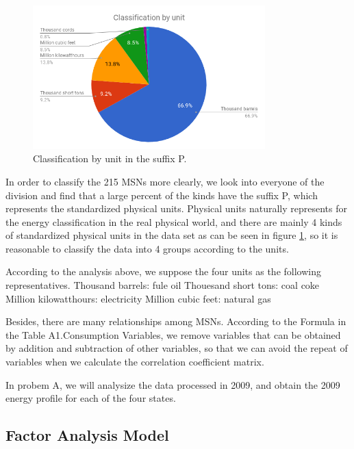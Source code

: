 \documentclass[a4paper,11pt]{article}
\begin{document}
\begin{figure}[!h]%
    \centering 
    \includegraphics[width=0.8\textwidth]{./Pic/classification_by_unit.png}
    \caption{Classification by unit in the suffix P.}
    \label{fig:classification_by_unit}  
\end{figure}

\par In order to classify the 215 MSNs more clearly, we look into everyone of the division and find that a large percent of the kinds have the suffix P, which represents the standardized physical units. Physical units naturally represents for the energy classification in the real physical world, and there are mainly 4 kinds of standardized physical units in the data set as can be seen in figure \ref{fig:classification_by_unit}, so it is reasonable to classify the data into 4 groups according to the units.
\par According to the analysis above, we suppose the four units as the following representatives.
Thousand barrels: fule oil
Thouesand short tons: coal coke
Million kilowatthours: electricity
Million cubic feet: natural gas
\par Besides, there are many relationships among MSNs. According to the Formula in the Table A1.Consumption Variables,\cite{4} we remove variables that can be obtained by addition and subtraction of other variables, so that we can avoid the repeat of variables when we calculate the correlation coefficient matrix. 
\par In probem A, we will analysize the data processed in 2009, and obtain the 2009 energy profile for each of the four states.

\subsection{Factor Analysis Model}
\end{document}
